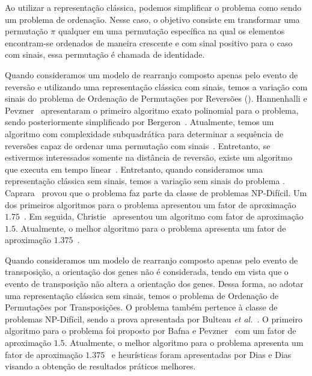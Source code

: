 Ao utilizar a representação clássica, podemos simplificar o problema como sendo um problema de ordenação. Nesse caso, o objetivo consiste em transformar uma permutação $\pi$ qualquer em uma permutação específica na qual os elementos encontram-se ordenados de maneira crescente e com sinal positivo para o caso com sinais, essa permutação é chamada de identidade.

Quando consideramos um modelo de rearranjo composto apenas pelo evento de reversão e utilizando uma representação clássica com sinais, temos a variação com sinais do problema de Ordenação de Permutações por Reversões (\SbR). Hannenhalli e Pevzner~\cite{1999-hannenhalli-pevzner} apresentaram o primeiro algoritmo exato polinomial para o problema, sendo posteriormente simplificado por Bergeron~\cite{2005-bergeron}. Atualmente, temos um algoritmo com complexidade subquadrática para determinar a sequência de reversões capaz de ordenar uma permutação com sinais~\cite{2007-tannier-etal}. Entretanto, se estivermos interessados somente na distância de reversão, existe um algoritmo que executa em tempo linear~\cite{2001-bader-etal}. Entretanto, quando consideramos uma representação clássica sem sinais, temos a variação sem sinais do problema \SbR. Caprara~\cite{1999-caprara} provou que o problema faz parte da classe de problemas NP-Difícil. Um dos primeiros algoritmos para o problema apresentou um fator de aproximação $1.75$~\cite{1996-bafna-pevzner}. Em seguida, Christie~\cite{1998a-christie} apresentou um algoritmo com fator de aproximação $1.5$. Atualmente, o melhor algoritmo para o problema apresenta um fator de aproximação $1.375$~\cite{2002-berman-etal}.

Quando consideramos um modelo de rearranjo composto apenas pelo evento de transposição, a orientação dos genes não é considerada, tendo em vista que o evento de transposição não altera a orientação dos genes. Dessa forma, ao adotar uma representação clássica sem sinais, temos o problema de Ordenação de Permutações por Transposições. O problema também pertence à classe de problemas NP-Difícil, sendo a prova apresentada por Bulteau \textit{et al.}~\cite{2012-bulteau-etal}. O primeiro algoritmo para o problema foi proposto por Bafna e Pevzner~\cite{1998-bafna-pevzner} com um fator de aproximação $1.5$. Atualmente, o melhor algoritmo para o problema apresenta um fator de aproximação $1.375$~\cite{2006-elias-hartman,2022-silva-etal} e heurísticas foram apresentadas por Dias e Dias~\cite{2010c-dias-dias} visando a obtenção de resultados práticos melhores. 

